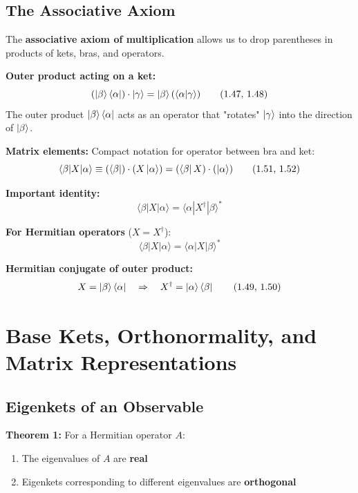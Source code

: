 \documentclass[11pt,a4paper]{article}
\begin{document}
\subsection{The Associative Axiom}

The \textbf{associative axiom of multiplication} allows us to drop parentheses in products of kets, bras, and operators.

\textbf{Outer product acting on a ket:}
\begin{equation}
(\ket{\beta}\bra{\alpha}) \cdot \ket{\gamma} = \ket{\beta}(\langle\alpha|\gamma\rangle)
\tag{1.47, 1.48}
\end{equation}
The outer product $\ket{\beta}\bra{\alpha}$ acts as an operator that "rotates" $\ket{\gamma}$ into the direction of $\ket{\beta}$.

\textbf{Matrix elements:} Compact notation for operator between bra and ket:
\begin{equation}
\langle\beta|X|\alpha\rangle \equiv (\bra{\beta}) \cdot (X\ket{\alpha}) = (\bra{\beta}X) \cdot (\ket{\alpha})
\tag{1.51, 1.52}
\end{equation}

\textbf{Important identity:}
\begin{equation}
\langle\beta|X|\alpha\rangle = \langle\alpha|X^\dagger|\beta\rangle^*
\tag{1.53}
\end{equation}

\textbf{For Hermitian operators} ($X = X^\dagger$):
\begin{equation}
\langle\beta|X|\alpha\rangle = \langle\alpha|X|\beta\rangle^*
\tag{1.54}
\end{equation}

\textbf{Hermitian conjugate of outer product:}
\begin{equation}
X = \ket{\beta}\bra{\alpha} \quad \Rightarrow \quad X^\dagger = \ket{\alpha}\bra{\beta}
\tag{1.49, 1.50}
\end{equation}
\newpage
\section{Base Kets, Orthonormality, and Matrix Representations}

\subsection{Eigenkets of an Observable}

\textbf{Theorem 1:} For a Hermitian operator $A$:
\begin{enumerate}
\item The eigenvalues of $A$ are \textbf{real}
\item Eigenkets corresponding to different eigenvalues are \textbf{orthogonal}
\end{enumerate}
\end{document}
